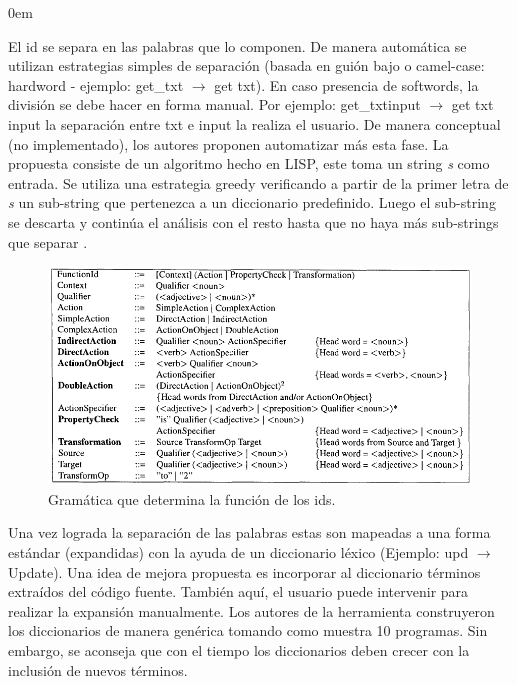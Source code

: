 \documentclass[a4paper,12pt]{report}
\begin{document}
\begin{description}
\itemsep0em%
\item[Segmentation:] El id se separa en las palabras que lo componen. De manera automática se utilizan estrategias simples de separación (basada en guión bajo o camel-case: hardword - ejemplo: \textsf{get\_txt} $\rightarrow$ \textsf{get txt}). En caso presencia de softwords, la división se debe hacer en forma manual. Por ejemplo: \textsf{get\_txtinput} $\rightarrow$ \textsf{get txt input} la separación entre \textsf{txt} e \textsf{input} la realiza el usuario. De manera conceptual (no implementado), los autores proponen automatizar más esta fase. La propuesta consiste de un algoritmo hecho en LISP, este toma un string \textit{s} como entrada. Se utiliza una estrategia greedy verificando a partir de la primer letra de \textit{s} un sub-string que pertenezca a un diccionario predefinido. Luego el sub-string se descarta y continúa el análisis con el resto hasta que no haya más sub-strings que separar \cite{BCPT99}.

\begin{figure}[h] %
\centerline{%
\includegraphics[scale= 0.60]{./ire_3.png}
}
\caption{Gramática que determina la función de los ids.}
\label{ire3}
\end{figure}

\item[Standard Lexicon:] Una vez lograda la separación de las palabras estas son mapeadas a una forma estándar (expandidas) con la ayuda de un diccionario léxico \cite{BCPT99} (Ejemplo: \textsf{upd} $\rightarrow$ \textsf{Update}). Una idea de mejora propuesta es incorporar al diccionario términos extraídos del código fuente. También aquí, el usuario puede intervenir para realizar la expansión manualmente. Los autores \cite{BCPT00} de la herramienta construyeron los diccionarios de manera genérica tomando como muestra 10 programas. Sin embargo, se aconseja que con el tiempo los diccionarios deben crecer con la inclusión de nuevos términos.


\end{description}
\end{document}
